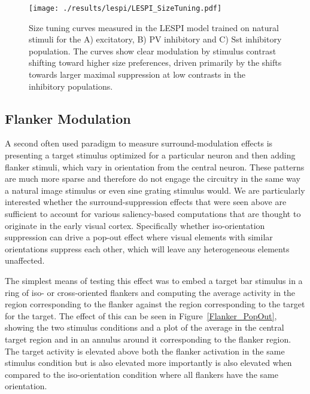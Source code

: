 \begin{figure}
	\centering
        \texttt{[image: ./results/lespi/LESPI\_SizeTuning.pdf]}
	\caption[Size tuning curves of the excitatory, PV and Sst
      population at various contrasts.]{Size tuning curves measured in
      the LESPI model trained on natural stimuli for the A)
      excitatory, B) PV inhibitory and C) Sst inhibitory
      population. The curves show clear modulation by stimulus
      contrast shifting toward higher size preferences, driven
      primarily by the shifts towards larger maximal suppression at
      low contrasts in the inhibitory populations.}
	\label{LESPI_SizeTuning}
\end{figure}

\subsection{Flanker Modulation}

A second often used paradigm to measure surround-modulation effects is
presenting a target stimulus optimized for a particular neuron and
then adding flanker stimuli, which vary in orientation from the
central neuron. These patterns are much more sparse and therefore do
not engage the circuitry in the same way a natural image stimulus or
even sine grating stimulus would. We are particularly interested
whether the surround-suppression effects that were seen above are
sufficient to account for various saliency-based computations that are
thought to originate in the early visual cortex. Specifically whether
iso-orientation suppression can drive a pop-out effect where visual
elements with similar orientations suppress each other, which will
leave any heterogeneous elements unaffected.

The simplest means of testing this effect was to embed a target bar
stimulus in a ring of iso- or cross-oriented flankers and computing
the average activity in the region corresponding to the flanker
against the region corresponding to the target for the target. The
effect of this can be seen in Figure~\ref{Flanker_PopOut}, showing the
two stimulus conditions and a plot of the average in the central
target region and in an annulus around it corresponding to the flanker
region. The target activity is elevated above both the flanker
activation in the same stimulus condition but is also elevated more
importantly is also elevated when compared to the iso-orientation
condition where all flankers have the same orientation.

